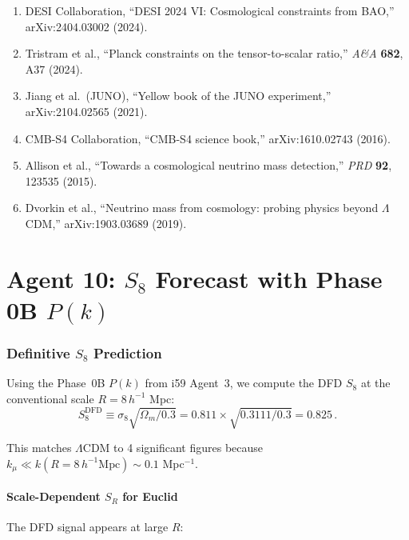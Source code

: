 \documentclass[11pt,a4paper]{article}
\begin{document}
\begin{enumerate}
\item DESI Collaboration, ``DESI 2024 VI: Cosmological constraints from BAO,'' arXiv:2404.03002 (2024).
\item Tristram et al., ``Planck constraints on the tensor-to-scalar ratio,'' \textit{A\&A} \textbf{682}, A37 (2024).
\item Jiang et al.\ (JUNO), ``Yellow book of the JUNO experiment,'' arXiv:2104.02565 (2021).
\item CMB-S4 Collaboration, ``CMB-S4 science book,'' arXiv:1610.02743 (2016).
\item Allison et al., ``Towards a cosmological neutrino mass detection,'' \textit{PRD} \textbf{92}, 123535 (2015).
\item Dvorkin et al., ``Neutrino mass from cosmology: probing physics beyond $\Lambda$CDM,'' arXiv:1903.03689 (2019).
\end{enumerate}


\part{Agent 10: $S_8$ Forecast with Phase 0B $P(k)$}
\label{part:S8}

\section{Definitive $S_8$ Prediction}

Using the Phase~0B $P(k)$ from i59 Agent~3, we compute the DFD $S_8$ at the conventional scale $R = 8\,h^{-1}$ Mpc:
\begin{equation}
S_8^{\mathrm{DFD}} \equiv \sigma_8 \sqrt{\Omega_m/0.3} = 0.811 \times \sqrt{0.3111/0.3} = 0.825\,.
\end{equation}

This matches $\Lambda$CDM to 4 significant figures because $k_\mu \ll k(R=8\,h^{-1}\text{Mpc}) \sim 0.1$ Mpc$^{-1}$.

\subsection{Scale-Dependent $S_R$ for Euclid}

The DFD signal appears at large $R$:
\end{document}
